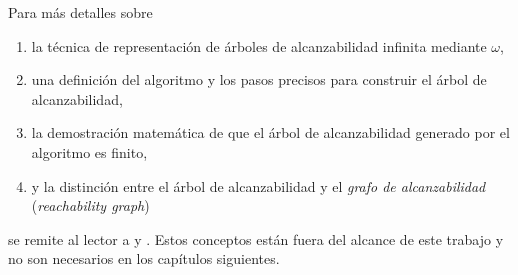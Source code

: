 Para más detalles sobre

\begin{enumerate}
      \item la técnica de representación de árboles de alcanzabilidad infinita mediante $\omega$,
      \item una definición del algoritmo y los pasos precisos para construir el árbol de alcanzabilidad,
      \item la demostración matemática de que el árbol de alcanzabilidad generado por el algoritmo es finito,
      \item y la distinción entre el árbol de alcanzabilidad y el \emph{grafo de alcanzabilidad} (\textit{reachability graph})
\end{enumerate}

se remite al lector a \cite{murata1989} y \cite{peterson1981}.
Estos conceptos están fuera del alcance de este trabajo y
no son necesarios en los capítulos siguientes.